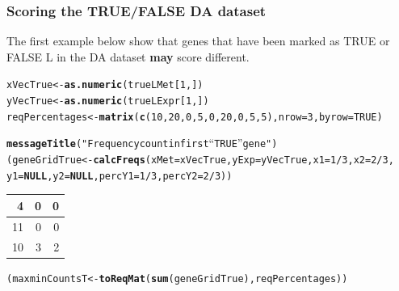 \documentclass[a4paper,10pt]{article}\usepackage[]{graphicx}\usepackage[]{xcolor}
\makeatletter
\newcommand{\hlnum}[1]{\textcolor[rgb]{0.686,0.059,0.569}{#1}}%
\newcommand{\hlstr}[1]{\textcolor[rgb]{0.192,0.494,0.8}{#1}}%
\newcommand{\hlopt}[1]{\textcolor[rgb]{0,0,0}{#1}}%
\newcommand{\hlstd}[1]{\textcolor[rgb]{0.345,0.345,0.345}{#1}}%
\newcommand{\hlkwa}[1]{\textcolor[rgb]{0.161,0.373,0.58}{\textbf{#1}}}%
\newcommand{\hlkwb}[1]{\textcolor[rgb]{0.69,0.353,0.396}{#1}}%
\newcommand{\hlkwc}[1]{\textcolor[rgb]{0.333,0.667,0.333}{#1}}%
\newcommand{\hlkwd}[1]{\textcolor[rgb]{0.737,0.353,0.396}{\textbf{#1}}}%
\newenvironment{kframe}{%
 \def\at@end@of@kframe{}%
 \ifinner\ifhmode%
  \def\at@end@of@kframe{\end{minipage}}%
  \begin{minipage}{\columnwidth}%
 \fi\fi%
 \def\FrameCommand##1{\hskip\@totalleftmargin \hskip-\fboxsep
 \colorbox{shadecolor}{##1}\hskip-\fboxsep
     \hskip-\linewidth \hskip-\@totalleftmargin \hskip\columnwidth}%
 \MakeFramed {\advance\hsize-\width
   \@totalleftmargin\z@ \linewidth\hsize
   \@setminipage}}%
 {\par\unskip\endMakeFramed%
 \at@end@of@kframe}
\newenvironment{knitrout}{}{} %
\makeatother
\begin{document}
\subsubsection{Scoring the TRUE/FALSE DA dataset}

The first example below show that genes that have been marked as TRUE or FALSE L in the DA dataset \textbf{may} score different.

\begin{knitrout}
\color{fgcolor}\begin{kframe}
\begin{alltt}
\hlstd{xVecTrue}\hlkwb{<-} \hlkwd{as.numeric}\hlstd{(trueLMet[}\hlnum{1}\hlstd{,])}
\hlstd{yVecTrue}\hlkwb{<-} \hlkwd{as.numeric}\hlstd{(trueLExpr[}\hlnum{1}\hlstd{,])}
\hlstd{reqPercentages} \hlkwb{<-} \hlkwd{matrix} \hlstd{(}\hlkwd{c}\hlstd{(}\hlnum{10}\hlstd{,} \hlnum{20}\hlstd{,} \hlnum{0}\hlstd{,} \hlnum{5}\hlstd{,} \hlnum{0}\hlstd{,} \hlnum{20}\hlstd{,} \hlnum{0}\hlstd{,} \hlnum{5}\hlstd{,} \hlnum{5}\hlstd{),} \hlkwc{nrow}\hlstd{=}\hlnum{3}\hlstd{,} \hlkwc{byrow}\hlstd{=}\hlnum{TRUE}\hlstd{)}

\hlkwd{messageTitle}\hlstd{(}\hlstr{"Frequency count in first ``TRUE'' gene"}\hlstd{)}
\hlstd{(geneGridTrue} \hlkwb{<-} \hlkwd{calcFreqs}\hlstd{(}\hlkwc{xMet}\hlstd{=xVecTrue,} \hlkwc{yExp}\hlstd{=yVecTrue,} \hlkwc{x1}\hlstd{=}\hlnum{1}\hlopt{/}\hlnum{3}\hlstd{,} \hlkwc{x2}\hlstd{=}\hlnum{2}\hlopt{/}\hlnum{3}\hlstd{,}
                          \hlkwc{y1}\hlstd{=}\hlkwa{NULL}\hlstd{,} \hlkwc{y2}\hlstd{=}\hlkwa{NULL}\hlstd{,} \hlkwc{percY1}\hlstd{=}\hlnum{1}\hlopt{/}\hlnum{3}\hlstd{,} \hlkwc{percY2}\hlstd{=}\hlnum{2}\hlopt{/}\hlnum{3}\hlstd{))}
\end{alltt}
\end{kframe}


\begin{tabular}{r|r|r}
\hline
4 & 0 & 0\\
\hline
11 & 0 & 0\\
\hline
10 & 3 & 2\\
\hline
\end{tabular}\begin{kframe}\begin{alltt}
\hlstd{(maxminCountsT} \hlkwb{<-} \hlkwd{toReqMat} \hlstd{(}\hlkwd{sum}\hlstd{(geneGridTrue), reqPercentages))}
\end{alltt}
\end{kframe}



\end{knitrout}
\end{document}
